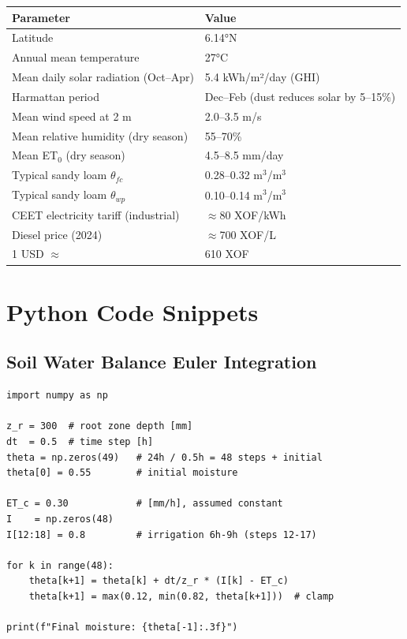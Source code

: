 \documentclass[12pt,a4paper,openany]{book}
\begin{document}
\begin{table}[H]
\centering
\renewcommand{\arraystretch}{1.4}
\begin{tabular}{ll}
\toprule
\textbf{Parameter}&\textbf{Value}\\
\midrule
Latitude & 6.14°N\\
Annual mean temperature & 27°C\\
Mean daily solar radiation (Oct--Apr) & 5.4 kWh/m²/day (GHI)\\
Harmattan period & Dec--Feb (dust reduces solar by 5--15\%)\\
Mean wind speed at 2 m & 2.0--3.5 m/s\\
Mean relative humidity (dry season) & 55--70\%\\
Mean ET$_0$ (dry season) & 4.5--8.5 mm/day\\
Typical sandy loam $\theta_{fc}$ & 0.28--0.32 m$^3$/m$^3$\\
Typical sandy loam $\theta_{wp}$ & 0.10--0.14 m$^3$/m$^3$\\
CEET electricity tariff (industrial) & $\approx$80 XOF/kWh\\
Diesel price (2024) & $\approx$700 XOF/L\\
1 USD $\approx$ & 610 XOF\\
\bottomrule
\end{tabular}
\end{table}

\chapter{Python Code Snippets}
\label{app:code}

\section{Soil Water Balance Euler Integration}
\begin{verbatim}
import numpy as np

z_r = 300  # root zone depth [mm]
dt  = 0.5  # time step [h]
theta = np.zeros(49)   # 24h / 0.5h = 48 steps + initial
theta[0] = 0.55        # initial moisture

ET_c = 0.30            # [mm/h], assumed constant
I    = np.zeros(48)
I[12:18] = 0.8         # irrigation 6h-9h (steps 12-17)

for k in range(48):
    theta[k+1] = theta[k] + dt/z_r * (I[k] - ET_c)
    theta[k+1] = max(0.12, min(0.82, theta[k+1]))  # clamp

print(f"Final moisture: {theta[-1]:.3f}")
\end{verbatim}
\end{document}
